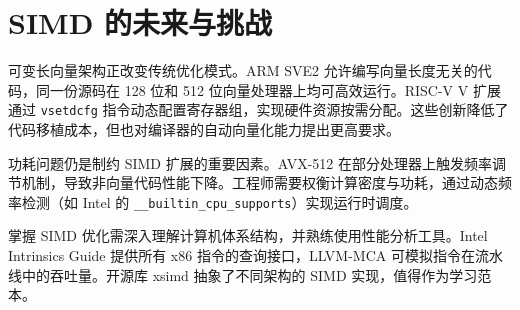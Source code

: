 \chapter{SIMD 的未来与挑战}
可变长向量架构正改变传统优化模式。ARM SVE2 允许编写向量长度无关的代码，同一份源码在 128 位和 512 位向量处理器上均可高效运行。RISC-V V 扩展通过 \verb!vsetdcfg! 指令动态配置寄存器组，实现硬件资源按需分配。这些创新降低了代码移植成本，但也对编译器的自动向量化能力提出更高要求。\par
功耗问题仍是制约 SIMD 扩展的重要因素。AVX-512 在部分处理器上触发频率调节机制，导致非向量代码性能下降。工程师需要权衡计算密度与功耗，通过动态频率检测（如 Intel 的 \verb!__builtin_cpu_supports!）实现运行时调度。\par
掌握 SIMD 优化需深入理解计算机体系结构，并熟练使用性能分析工具。Intel Intrinsics Guide 提供所有 x86 指令的查询接口，LLVM-MCA 可模拟指令在流水线中的吞吐量。开源库 xsimd 抽象了不同架构的 SIMD 实现，值得作为学习范本。\par
